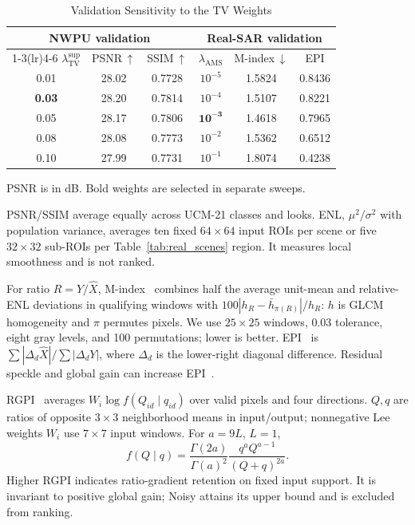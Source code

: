 \documentclass[journal]{IEEEtran}
\newcommand{\rev}[1]{{\color{RevisionBlue}#1}}
\newcommand{\rev}[1]{#1}
\begin{document}
\begin{table}[!t]
\caption{\rev{Validation Sensitivity to the TV Weights}}
\label{tab:lambda}
\centering
\footnotesize
\setlength{\tabcolsep}{2.5pt}
\renewcommand{\arraystretch}{1.05}
\rev{\begin{tabular*}{\columnwidth}{@{\extracolsep{\fill}}cccccc@{}}
\toprule
\multicolumn{3}{c}{NWPU validation} & \multicolumn{3}{c}{Real-SAR validation} \\
\cmidrule(lr){1-3}\cmidrule(lr){4-6}
\(\lambda_{\mathrm{TV}}^{\mathrm{sup}}\) & PSNR\,$\uparrow$ & SSIM\,$\uparrow$ & \(\lambda_{\mathrm{AMS}}\) & M-index\,$\downarrow$ & EPI \\
\midrule
0.01 & 28.02 & 0.7728 & \(10^{-5}\) & 1.5824 & 0.8436 \\
\textbf{0.03} & 28.20 & 0.7814 & \(10^{-4}\) & 1.5107 & 0.8221 \\
0.05 & 28.17 & 0.7806 & \(\mathbf{10^{-3}}\) & 1.4618 & 0.7965 \\
0.08 & 28.08 & 0.7773 & \(10^{-2}\) & 1.5362 & 0.6512 \\
0.10 & 27.99 & 0.7731 & \(10^{-1}\) & 1.8074 & 0.4238 \\
\bottomrule
\end{tabular*}}
\vspace{1pt}
\parbox{\columnwidth}{\footnotesize\rev{PSNR is in dB. Bold weights are selected in separate sweeps.}}
\end{table}

\rev{PSNR/SSIM average equally across UCM-21 classes and looks. ENL, \(\mu^2/\sigma^2\) with population variance, averages ten fixed \(64\times64\) input ROIs per scene or five \(32\times32\) sub-ROIs per Table~\ref{tab:real_scenes} region. It measures local smoothness and is not ranked.}

\rev{For ratio \(R=Y/\widehat X\), M-index~\cite{gomez2017} combines half the average unit-mean and relative-ENL deviations in qualifying windows with \(100|h_R-\bar h_{\pi(R)}|/h_R\): \(h\) is GLCM homogeneity and \(\pi\) permutes pixels. We use \(25\times25\) windows, 0.03 tolerance, eight gray levels, and 100 permutations; lower is better. EPI~\cite{ma2024epi} is \(\sum|\Delta_d\widehat X|/\sum|\Delta_dY|\), where \(\Delta_d\) is the lower-right diagonal difference. Residual speckle and global gain can increase EPI~\cite{vasquez2025ratio}.}

\rev{RGPI~\cite{ma2022rgpi} averages \(W_i\log f(Q_{id}\mid q_{id})\) over valid pixels and four directions. \(Q,q\) are ratios of opposite \(3\times3\) neighborhood means in input/output; nonnegative Lee weights \(W_i\) use \(7\times7\) input windows. For \(a=9L\), \(L=1\),
\begin{equation}
f(Q\mid q)=\frac{\Gamma(2a)}{\Gamma(a)^2}\frac{q^aQ^{a-1}}{(Q+q)^{2a}}.
\label{eq:rgpi}
\end{equation}
Higher RGPI indicates ratio-gradient retention on fixed input support. It is invariant to positive global gain; Noisy attains its upper bound and is excluded from ranking.}
\end{document}
